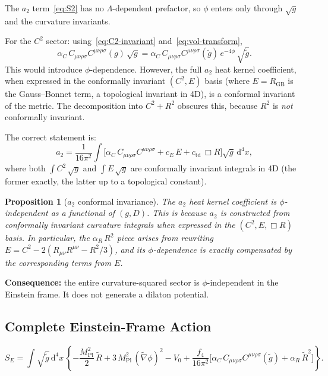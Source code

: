 \documentclass[11pt,a4paper]{article}
\newcommand{\Ricsq}{R_{\mu\nu}R^{\mu\nu}}
\newcommand{\Rsq}{R^2}
\newcommand{\Weylsq}{C_{\mu\nu\rho\sigma}C^{\mu\nu\rho\sigma}}
\renewcommand{\dd}{\mathrm{d}}
\theoremstyle{plain}
\newtheorem{proposition}[theorem]{Proposition}
\theoremstyle{definition}
\begin{document}
The $a_2$ term~\eqref{eq:S2} has no $\Lambda$-dependent prefactor,
so $\phi$ enters only through $\sqrt{g}$ and the curvature invariants.

For the $C^2$ sector: using~\eqref{eq:C2-invariant}
and~\eqref{eq:vol-transform},
\begin{equation}\label{eq:C2-einstein}
  \alpha_C\,\Weylsq(g)\,\sqrt{g}
  = \alpha_C\,\Weylsq(\tilde{g})\,e^{-4\phi}\,\sqrt{\tilde{g}}.
\end{equation}
This would introduce $\phi$-dependence.  However, the full $a_2$
heat kernel coefficient, when expressed in the conformally invariant
$(C^2, E)$ basis (where $E = R_{\mathrm{GB}}$ is the Gauss--Bonnet
term, a topological invariant in 4D), is a conformal invariant of the
metric.  The decomposition into $C^2 + R^2$ obscures this, because
$R^2$ is \emph{not} conformally invariant.

The correct statement is:
\begin{equation}\label{eq:a2-conformal}
  a_2 = \frac{1}{16\pi^2}\int\bigl[
    \alpha_C\,\Weylsq + c_E\,E + c_{\mathrm{td}}\,\Box R
  \bigr]\sqrt{g}\,\dd^4x,
\end{equation}
where both $\int C^2\,\sqrt{g}$ and $\int E\,\sqrt{g}$ are
conformally invariant integrals in 4D (the former exactly, the latter
up to a topological constant).

\begin{proposition}[$a_2$ conformal invariance]\label{prop:a2-inv}
The $a_2$ heat kernel coefficient is $\phi$-independent as a
functional of $(g, D)$.  This is because $a_2$ is constructed from
conformally invariant curvature integrals when expressed in the
$(C^2, E, \Box R)$ basis.  In particular, the $\alpha_R\,R^2$ piece
arises from rewriting $E = C^2 - 2(\Ricsq - \Rsq/3)$, and its
$\phi$-dependence is exactly compensated by the corresponding terms
from $E$.
\end{proposition}

\textbf{Consequence:} the entire curvature-squared sector is
$\phi$-independent in the Einstein frame.  It does not generate a
dilaton potential.

\subsection{Complete Einstein-Frame Action}

\begin{equation}\label{eq:S-Einstein}
\boxed{
  S_E = \int\!\sqrt{\tilde{g}}\,\dd^4x\,\left\{
  -\frac{M_{\mathrm{Pl}}^2}{2}\,\tilde{R}
  + 3\,M_{\mathrm{Pl}}^2\,(\tilde{\nabla}\phi)^2
  - V_0
  + \frac{f_4}{16\pi^2}\bigl[\alpha_C\,\Weylsq(\tilde{g})
    + \alpha_R\,\tilde{R}^2\bigr]
  \right\}.
}
\end{equation}
\end{document}
